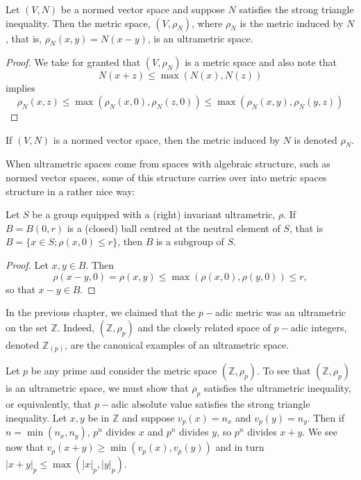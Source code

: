 \begin{proposition}
	Let $(V,N)$ be a normed vector space and suppose $N$ satisfies the strong triangle inequality. Then the metric space, $(V,\rho_N)$, where $\rho_N$ is the metric induced by $N$, that is, $\rho_N(x,y) = N(x-y)$, is an ultrametric space.
\end{proposition}

\begin{proof}
We take for granted that  $(V,\rho_N)$ is a metric space and also note that 
\[N(x + z) \leq \max(N(x), N(z))\]
 implies  
\[\rho_N(x,z) \leq \max(\rho_N(x,0), \rho_N(z,0)) \leq \max(\rho_N(x,y), \rho_N(y,z))\]
\end{proof}

\begin{notation*}
 If $(V, N)$ is a normed vector space, then the metric induced by $N$ is denoted $\rho_N$.
\end{notation*}

When ultrametric spaces come from spaces with algebraic structure, such as normed vector spaces, some of this structure carries over into metric spaces structure in a rather nice way:\\

\begin{proposition}
\cite{ar} Let $S$ be a  group equipped with a (right) invariant ultrametric, $\rho$. If $B=B(0,r)$ is a (closed) ball centred at the neutral element of $S$, that is $B=\{x \in S; \rho(x,0) \leq r\}$, then $B$ is a subgroup of $S$.
\end{proposition}

\begin{proof}
Let $x,y \in B$. Then \[\rho(x-y,0) = \rho(x,y)  \leq \max(\rho(x,0), \rho(y,0)) \leq r,\]
so that $x-y \in B$.
\end{proof}
 
In the previous chapter, we claimed that the $p-$adic metric was an ultrametric on the set $\mathbb{Z}$. Indeed, $(\mathbb{Z}, \rho_p)$ and the closely related space of $p-$adic integers, denoted $\mathbb{Z}_{(p)}$, are the canonical examples of an ultrametric space. \\

\begin{example} 
Let $p$ be any prime and consider the metric space $(\mathbb{Z}, \rho_p)$. To see that $(\mathbb{Z}, \rho_p)$ is an ultrametric space, we must show that $\rho_p$ satisfies the ultrametric inequality, or equivalently, that $p-$adic absolute value satisfies the strong triangle inequality. Let $x,y$ be in $\mathbb{Z}$ and suppose $v_p(x)= n_x$ and $v_p(y)= n_y$. Then if $n=\min(n_x,n_y)$, $p^n $ divides $x$ and $p^n$ divides $y$, so $p^n$ divides $x +y$. We see now that $v_p(x+y) \geq \min(v_p(x),  v_p(y))$ and in turn $\lvert x + y \rvert_p \leq \max(\lvert x \rvert_p, \lvert y \rvert_p)$.
\end{example}

